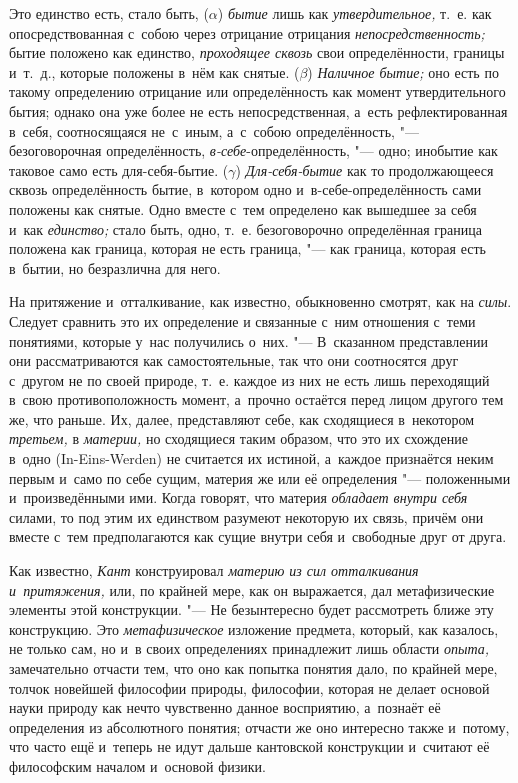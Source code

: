 Это единство есть, стало быть, ($\alpha$) {\em бытие} лишь как
{\em утвердительное,} т.~е. как опосредствованная с~собою через отрицание
отрицания {\em непосредственность;} бытие положено как единство,
{\em проходящее сквозь} свои определённости, границы и~т.~д., которые положены
в~нём как снятые. ($\beta$) {\em Наличное бытие;} оно есть по такому
определению отрицание или определённость как момент утвердительного бытия;
однако она уже более не есть непосредственная, а~есть рефлектированная в~себя,
соотносящаяся не~с~иным, а~с~собою определённость, "--- безоговорочная
определённость, {\em в-себе}-определённость, "--- одно; инобытие как таковое
само есть для-себя-бытие. ($\gamma$) {\em Для-себя-бытие} как то продолжающееся
сквозь определённость бытие, в~котором одно и~в-себе-определённость сами
положены как снятые. Одно вместе с~тем определено как вышедшее за себя и~как
{\em единство;} стало быть, одно, т.~е. безоговорочно определённая граница
положена как граница, которая не есть граница, "--- как граница, которая есть
в~бытии, но безразлична для него.


На притяжение и~отталкивание, как известно, обыкновенно смотрят, как на
{\em силы}. Следует сравнить это их определение и
связанные с~ним отношения с~теми понятиями, которые у~нас получились о~них.
"--- В~сказанном представлении они рассматриваются как самостоятельные, так
что они соотносятся друг с~другом не по своей природе, т.~е. каждое из них
не есть лишь переходящий в~свою противоположность момент, а~прочно остаётся
перед лицом другого тем же, что раньше. Их, далее, представляют себе, как
сходящиеся в~некотором {\em третьем,} в
{\em материи,} но сходящиеся таким образом, что это их
схождение в~одно (In-Eins-Werden) не считается их истиной, а~каждое
признаётся неким первым и~само по себе сущим, материя же или её
определения "--- положенными и~произведёнными ими. Когда говорят, что материя
{\em обладает внутри себя} силами, то под этим их
единством разумеют некоторую их связь, причём они вместе с~тем
предполагаются как сущие внутри себя и~свободные друг от друга.

Как известно, {\em Кант} конструировал
{\em материю из сил отталкивания и~притяжения,} или, по
крайней мере, как он выражается, дал метафизические элементы этой
конструкции. "--- Не безынтересно будет рассмотреть ближе эту конструкцию. Это
{\em метафизическое} изложение предмета, который, как
казалось, не только сам, но и~в своих определениях принадлежит лишь области
{\em опыта,} замечательно отчасти тем, что оно как
попытка понятия дало, по крайней мере, толчок новейшей философии природы,
философии, которая не делает основой науки природу как нечто чувственно
данное восприятию, а~познаёт её определения из абсолютного понятия; отчасти
же оно интересно также и~потому, что часто ещё и~теперь не идут дальше
кантовской конструкции и~считают её философским началом и~основой физики.

